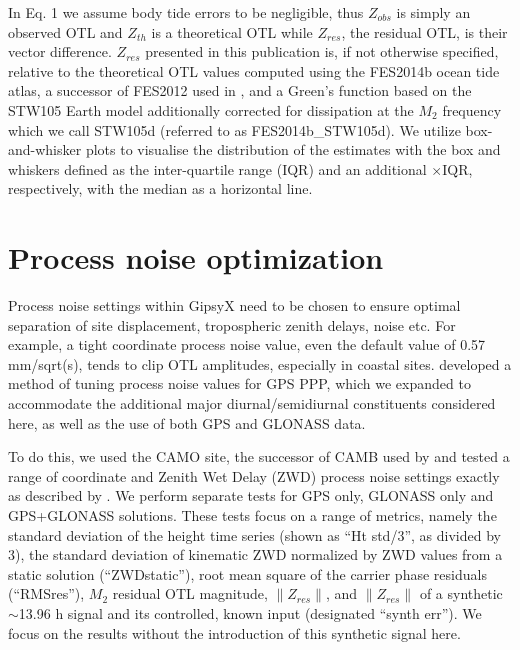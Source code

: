 \documentclass[se, manuscript]{copernicus}
\begin{document}
In Eq. 1 we assume body tide errors to be negligible, thus $Z_{obs}$ is simply an observed OTL and $Z_{th}$ is a theoretical OTL while $Z_{res}$, the residual OTL, is their vector difference. $Z_{res}$ presented in this publication is, if not otherwise specified, relative to the theoretical OTL values computed using the FES2014b ocean tide atlas, a successor of FES2012 used in \cite{Bos2015}, and a Green’s function based on the STW105 Earth model additionally corrected for dissipation at the $M_2$ frequency which we call STW105d (referred to as FES2014b\_STW105d). We utilize box-and-whisker plots to visualise the distribution of the estimates with the box and whiskers defined as the inter-quartile range (IQR) and an additional $\times \text{IQR}$, respectively, with the median as a horizontal line.

\section{Process noise optimization}
Process noise settings within GipsyX need to be chosen to ensure optimal separation of site displacement, tropospheric zenith delays, noise etc. For example, a tight coordinate process noise value, even the default value of 0.57 mm/sqrt(s), tends to clip OTL amplitudes, especially in coastal sites. \cite{Penna2015} developed a method of tuning process noise values for GPS PPP, which we expanded to accommodate the additional major diurnal/semidiurnal constituents considered here, as well as the use of both GPS and GLONASS data.

To do this, we used the CAMO site, the successor of CAMB used by \cite{Penna2015} and tested a range of coordinate and Zenith Wet Delay (ZWD) process noise settings exactly as described by \cite{Penna2015}. We perform separate tests for GPS only, GLONASS only and GPS+GLONASS solutions. These tests focus on a range of metrics, namely the standard deviation of the height time series (shown as “Ht std/3”, as divided by 3), the standard deviation of kinematic ZWD normalized by ZWD values from a static solution (“ZWDstatic”), root mean square of the carrier phase residuals (“RMSres”), $M_2$ residual OTL magnitude, $\|Z_{res}\|$, and $\|Z_{res}\|$ of a synthetic $\sim$13.96 h signal and its controlled, known input (designated “synth err”). We focus on the results without the introduction of this synthetic signal here.
\end{document}
